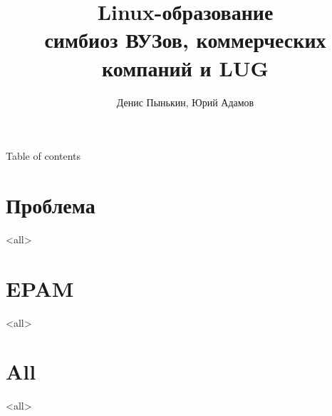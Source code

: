 
\graphicspath{{../lvee2013-winter/clipart/}}
\title{Linux-образование \\ симбиоз ВУЗов, коммерческих компаний и LUG}
\author{Денис Пынькин, Юрий Адамов}



\begin{frame}
	\titlepage
\end{frame}

\begin{frame}{Table of contents}
	\tableofcontents
\end{frame}


\section{Проблема}
\mode<all>{}
\section{EPAM}
\mode<all>{}
\section{All}
\mode<all>{}

